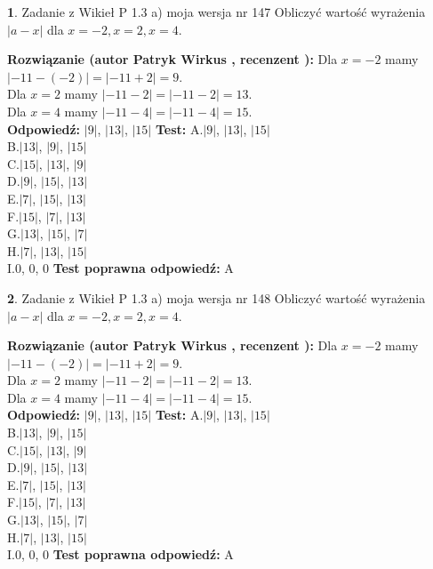 \documentclass[12pt, a4paper]{article}
\theoremstyle{definition} %
\newtheorem{zad}{}
\newcommand{\zadStart}[1]{\begin{zad}#1\newline}
\newcommand{\zadStop}{\end{zad}}
\newcommand{\rozwStart}[2]{\noindent \textbf{Rozwiązanie (autor #1 , recenzent #2): }\newline}
\newcommand{\rozwStop}{\newline}
\newcommand{\odpStart}{\noindent \textbf{Odpowiedź:}\newline}
\newcommand{\odpStop}{\newline}
\newcommand{\testStart}{\noindent \textbf{Test:}\newline}
\newcommand{\testStop}{\newline}
\newcommand{\kluczStart}{\noindent \textbf{Test poprawna odpowiedź:}\newline}
\newcommand{\kluczStop}{\newline}
\begin{document}
\zadStart{Zadanie z Wikieł P 1.3 a) moja wersja nr 147}
Obliczyć wartość wyrażenia $|a - x|$ dla $x=-2,x=2,x=4$.
\zadStop
\rozwStart{Patryk Wirkus}{}
Dla $x = -2$ mamy $|-11 - (-2)| = |-11 + 2| = 9$.\\
Dla $x = 2$ mamy $|-11 - 2| = |-11 - 2| = 13$.\\
Dla $x = 4$ mamy $|-11 - 4| = |-11 - 4| = 15$.\\
\rozwStop
\odpStart
$|9|$, $|13|$, $|15|$
\odpStop
\testStart
A.$|9|$, $|13|$, $|15|$\\
B.$|13|$, $|9|$, $|15|$\\
C.$|15|$, $|13|$, $|9|$\\
D.$|9|$, $|15|$, $|13|$\\
E.$|7|$, $|15|$, $|13|$\\
F.$|15|$, $|7|$, $|13|$\\
G.$|13|$, $|15|$, $|7|$\\
H.$|7|$, $|13|$, $|15|$\\
I.$0$, $0$, $0$
\testStop
\kluczStart
A
\kluczStop



\zadStart{Zadanie z Wikieł P 1.3 a) moja wersja nr 148}
Obliczyć wartość wyrażenia $|a - x|$ dla $x=-2,x=2,x=4$.
\zadStop
\rozwStart{Patryk Wirkus}{}
Dla $x = -2$ mamy $|-11 - (-2)| = |-11 + 2| = 9$.\\
Dla $x = 2$ mamy $|-11 - 2| = |-11 - 2| = 13$.\\
Dla $x = 4$ mamy $|-11 - 4| = |-11 - 4| = 15$.\\
\rozwStop
\odpStart
$|9|$, $|13|$, $|15|$
\odpStop
\testStart
A.$|9|$, $|13|$, $|15|$\\
B.$|13|$, $|9|$, $|15|$\\
C.$|15|$, $|13|$, $|9|$\\
D.$|9|$, $|15|$, $|13|$\\
E.$|7|$, $|15|$, $|13|$\\
F.$|15|$, $|7|$, $|13|$\\
G.$|13|$, $|15|$, $|7|$\\
H.$|7|$, $|13|$, $|15|$\\
I.$0$, $0$, $0$
\testStop
\kluczStart
A
\kluczStop
\end{document}
